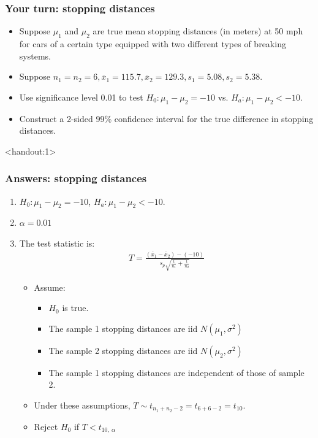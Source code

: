 \documentclass[handout]{beamer}\usepackage[]{graphicx}\usepackage[]{color}
\newcommand{\answers}{1}
\providecommand{\ov}[1]{\overline{#1}}
\numberwithin{equation}{section}
\begin{document}
\begin{frame}
\frametitle{Your turn: stopping distances}
\begin{itemize}
\item Suppose $\mu_1$ and $\mu_2$ are true mean stopping distances (in meters) at 50 mph for cars of a certain type equipped with two different types of breaking systems. 
\pause \item Suppose $n_1 = n_2 = 6, \ov{x}_1 = 115.7, \ov{x}_2 = 129.3, s_1 = 5.08, s_2 = 5.38$.
\pause \item Use significance level 0.01 to test $H_0: \mu_1 - \mu_2 = -10$ vs. $H_a: \mu_1 - \mu_2 < -10$. 
\pause \item Construct a 2-sided 99\% confidence interval for the true difference in stopping distances.
\end{itemize}
\end{frame}





\begin{frame}<handout:\answers>
\frametitle{Answers: stopping distances}
\begin{enumerate}[1. ]
\item $H_0:  \mu_1 - \mu_2 = -10$, $H_a: \mu_1 - \mu_2 < -10$. 
\pause \item $\alpha = 0.01$
\pause \item The test statistic is:
\pause \begin{align*}
T = \frac{(\ov{x}_1 - \ov{x}_2) - (-10)}{s_p \sqrt{\frac{1}{n_1} + \frac{1}{n_2}}}
\end{align*}
\begin{itemize}
\pause \item Assume:
\begin{itemize}
\pause \item $H_0$ is true.
\pause \item The sample 1 stopping distances are iid $N(\mu_1, \sigma^2)$
\pause \item The sample 2 stopping distances are iid $N(\mu_2, \sigma^2)$
\pause \item The sample 1 stopping distances are independent of those of sample 2.
\end{itemize}
\pause \item Under these assumptions, $T \sim t_{n_1 + n_2 - 2} = t_{6 + 6 - 2} = t_{10}$.
\pause \item Reject $H_0$ if $T < t_{10, \  \alpha}$
\end{itemize}
\setcounter{saveenum}{\value{enumi}}
\end{enumerate}
\end{frame}
\end{document}
